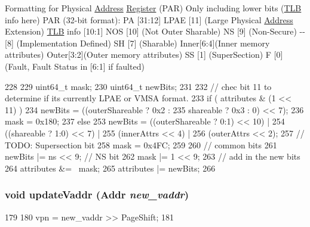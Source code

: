 Formatting for Physical \hyperlink{classAddress}{Address} \hyperlink{classRegister}{Register} (PAR) Only including lower bits (\hyperlink{classArmISA_1_1TLB}{TLB} info here) PAR (32-\/bit format): PA \mbox{[}31:12\mbox{]} LPAE \mbox{[}11\mbox{]} (Large Physical \hyperlink{classAddress}{Address} Extension) \hyperlink{classArmISA_1_1TLB}{TLB} info \mbox{[}10:1\mbox{]} NOS \mbox{[}10\mbox{]} (Not Outer Sharable) NS \mbox{[}9\mbox{]} (Non-\/Secure) -\/-\/ \mbox{[}8\mbox{]} (Implementation Defined) SH \mbox{[}7\mbox{]} (Sharable) Inner\mbox{[}6:4\mbox{]}(Inner memory attributes) Outer\mbox{[}3:2\mbox{]}(Outer memory attributes) SS \mbox{[}1\mbox{]} (SuperSection) F \mbox{[}0\mbox{]} (Fault, Fault Status in \mbox{[}6:1\mbox{]} if faulted)


\begin{DoxyCode}
228     {
229         uint64_t mask;
230         uint64_t newBits;
231 
232         // chec bit 11 to determine if its currently LPAE or VMSA format.
233         if ( attributes & (1 << 11) ) {
234             newBits = ((outerShareable ? 0x2 :
235                       shareable         ? 0x3 : 0) << 7);
236             mask = 0x180;
237         } else {
253             newBits = ((outerShareable ? 0:1) << 10) |
254                       ((shareable ? 1:0) << 7) |
255                       (innerAttrs << 4) |
256                       (outerAttrs << 2);
257                       // TODO: Supersection bit
258             mask = 0x4FC;
259         }
260         // common bits
261         newBits |= ns << 9;  // NS bit
262         mask    |= 1  << 9;
263         // add in the new bits
264         attributes &= ~mask;
265         attributes |= newBits;
266     }
\end{DoxyCode}
\hypertarget{structArmISA_1_1TlbEntry_a5b72666b92ee0adbe9a7d218a0343754}{
\subsubsection[{updateVaddr}]{\setlength{\rightskip}{0pt plus 5cm}void updateVaddr ({\bf Addr} {\em new\_\-vaddr})}}
\label{structArmISA_1_1TlbEntry_a5b72666b92ee0adbe9a7d218a0343754}



\begin{DoxyCode}
179     {
180         vpn = new_vaddr >> PageShift;
181     }
\end{DoxyCode}


